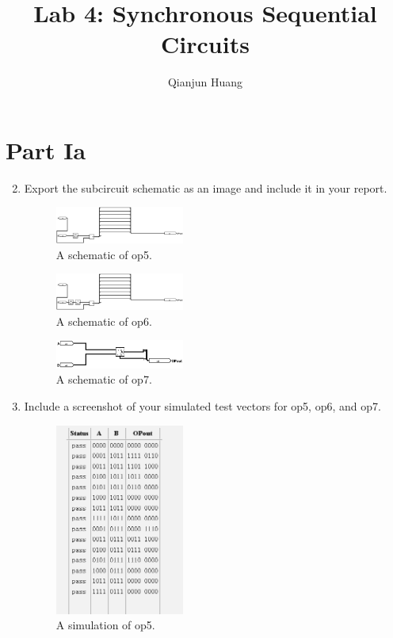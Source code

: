 \documentclass{article}
\title{Lab 4: Synchronous Sequential Circuits}
\author{Qianjun Huang}
\begin{document}
\maketitle

\section*{Part Ia}

\begin{enumerate}
\setcounter{enumi}{1}
\item Export the subcircuit schematic as an image and include it in your report.

\begin{figure}[ht!]
    \centering
    \includegraphics[width=0.4\textwidth]{lab4_op5.png}
    \caption{A schematic of op5.}
    \label{f:op5}
\end{figure}

\begin{figure}[ht!]
    \centering
    \includegraphics[width=0.4\textwidth]{lab4_op6.png}
    \caption{A schematic of op6.}
    \label{f:op6}
\end{figure}

\begin{figure}[ht!]
    \centering
    \includegraphics[width=0.4\textwidth]{lab4_op7.png}
    \caption{A schematic of op7.}
    \label{f:op7}
\end{figure}

\item Include a screenshot of your simulated test vectors for op5, op6, and op7.

\begin{figure}[ht!]
    \centering
    \includegraphics[width=0.4\textwidth]{lab4_op5_simulation.png}
    \caption{A simulation of op5.}
    \label{f:op5_simulation}
\end{figure}


\end{enumerate}
\end{document}
